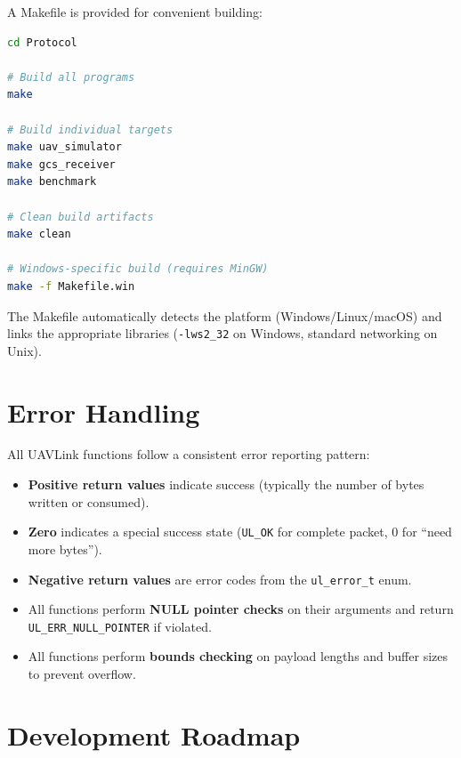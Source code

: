 \documentclass[11pt,a4paper]{article}
\begin{document}
A Makefile is provided for convenient building:

\begin{lstlisting}[language=bash]
cd Protocol

# Build all programs
make

# Build individual targets
make uav_simulator
make gcs_receiver
make benchmark

# Clean build artifacts
make clean

# Windows-specific build (requires MinGW)
make -f Makefile.win
\end{lstlisting}

The Makefile automatically detects the platform (Windows/Linux/macOS) and links the appropriate libraries (\texttt{-lws2\_32} on Windows, standard networking on Unix).

\section{Error Handling}

All UAVLink functions follow a consistent error reporting pattern:
\begin{itemize}[noitemsep]
    \item \textbf{Positive return values} indicate success (typically the number of bytes written or consumed).
    \item \textbf{Zero} indicates a special success state (\texttt{UL\_OK} for complete packet, 0 for ``need more bytes'').
    \item \textbf{Negative return values} are error codes from the \texttt{ul\_error\_t} enum.
    \item All functions perform \textbf{NULL pointer checks} on their arguments and return \texttt{UL\_ERR\_NULL\_POINTER} if violated.
    \item All functions perform \textbf{bounds checking} on payload lengths and buffer sizes to prevent overflow.
\end{itemize}

\section{Development Roadmap}
\end{document}
